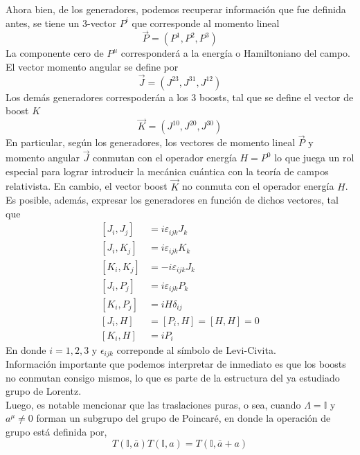 \documentclass[12pt,letterpaper]{article}
\begin{document}
Ahora bien, de los generadores, podemos recuperar información que fue definida antes, se tiene un 3-vector $P^i$ que corresponde al momento lineal
\begin{equation}
  \vec{P} = \left( P^1, P^2, P^3 \right)
\end{equation}
La componente cero de $P^\mu$ corresponderá a la energía o Hamiltoniano del campo. El vector momento angular se define por
\begin{equation}
  \vec{J} = \left( J^{23} , J^{31} , J^{12} \right)
\end{equation}
Los demás generadores correspoderán a los 3 boosts, tal que se define el vector de boost $K$
\begin{equation}
  \vec{K} = \left( J^{10} , J^{20}, J^{30} \right)
\end{equation}
En particular, según los generadores, los vectores de momento lineal $\vec{P}$ y momento angular $\vec{J}$ conmutan con el operador energía $H=P^0$ lo que juega un rol especial para lograr introducir la mecánica cuántica con la teoría de campos relativista. En cambio, el vector boost $\vec{K}$  no conmuta con el operador energía $H$. Es posible, además, expresar los generadores en función de dichos vectores, tal que
\begin{align}
  \left[ J_i,J_j \right] & = i\varepsilon_{ijk}J_k\\
  \left[ J_i , K_j \right] & = i\varepsilon_{ijk}K_k \\
  \left[ K_i,K_j \right] & =-i\varepsilon_{ijk}J_k \\
  \left[ J_i , P_j\right] & = i\varepsilon_{ijk}P_k \\
  \left[ K_i,P_j \right] & = iH\delta_{ij} \\
  \left[ J_i , H \right] & = \left[ P_i, H \right] = \left[ H , H \right] = 0  \\
  \left[ K_i, H \right] & = iP_i
\end{align}
En donde $i=1,2,3$ y $\epsilon_{ijk}$ correponde al símbolo de Levi-Civita. \\ 
Información importante que podemos interpretar de inmediato es que los boosts no conmutan consigo mismos, lo que es parte de la estructura del ya estudiado grupo de Lorentz. \\
Luego, es notable mencionar que las traslaciones puras, o sea, cuando $\Lambda=\mathbb{I}$ y $a^\mu\neq0$ forman un subgrupo del grupo de Poincaré, en donde la operación de grupo está definida por,
\begin{equation}
  T(\mathbb{I},\bar{a})T(\mathbb{I},a) = T(\mathbb{I},\bar{a}+a)
 \end{equation}
\end{document}
